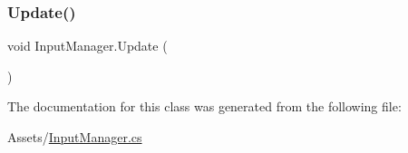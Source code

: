 \subsubsection{\texorpdfstring{Update()}{Update()}}
{\footnotesize\ttfamily void Input\+Manager.\+Update (\begin{DoxyParamCaption}{ }\end{DoxyParamCaption})\hspace{0.3cm}{\ttfamily [private]}}



The documentation for this class was generated from the following file\+:\begin{DoxyCompactItemize}
\item 
Assets/\hyperlink{_input_manager_8cs}{Input\+Manager.\+cs}\end{DoxyCompactItemize}
